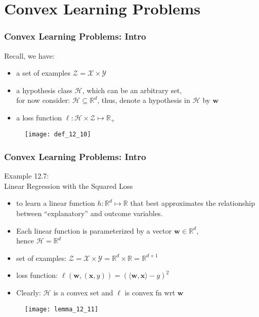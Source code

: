 \section{Convex Learning Problems}


\begin{frame}
\frametitle{Convex Learning Problems: Intro}

Recall, we have:
\begin{itemize}
    \item a set of examples $\mathcal{Z} = \mathcal{X} \times \mathcal{Y}$
    \item a hypothesis class $\mathcal{H}$, which can be an arbitrary set,\\
    for now consider: $ \mathcal{H} \subseteq \mathbb{R}^d$,
    thus, denote a hypothesis in $\mathcal{H}$ by $\mathbf{w}$
    \item a loss function $\ell: \mathcal{H} \times \mathcal{Z} \mapsto \mathbb{R_{+}}$
\end{itemize}

\begin{figure}
    \centering
    \texttt{[image: def\_12\_10]}
\end{figure}

\end{frame}

\begin{frame}
\frametitle{Convex Learning Problems: Intro}

Example 12.7: \\
Linear Regression with the Squared Loss
\begin{itemize}
    \item  to learn a linear function $h: \mathbb{R}^d \mapsto \mathbb{R}$ that best approximates
        the relationship between ``explanatory'' and outcome variables.
    \item Each linear function is parameterized by a vector $\mathbf{w} \in \mathbb{R}^d$,\\
        hence $\mathcal{H} = \mathbb{R}^d$
    \item set of examples:
    $\mathcal{Z} = \mathcal{X} \times \mathcal{Y} = \mathbb{R}^d \times \mathbb{R} = \mathbb{R}^{d+1}$
    \item loss function: $\ell(\mathbf{w}, (\mathbf{x}, y)) = (\langle \mathbf{w},\mathbf{x}  \rangle - y)^2$
    \item Clearly: $\mathcal{H}$ is a convex set and  $\ell$ is convex fn wrt $\mathbf{w}$
\end{itemize}

\begin{figure}
    \centering
    \texttt{[image: lemma\_12\_11]}
\end{figure}

\end{frame}

